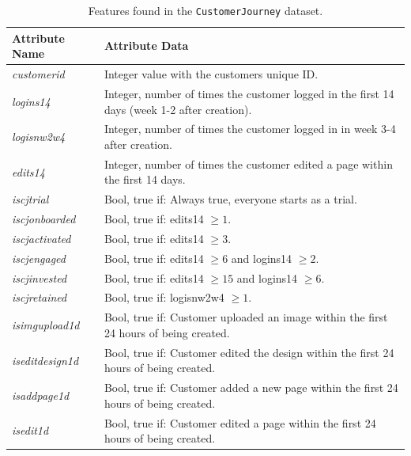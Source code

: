 \begin{table}[H]
	\centering
	\begin{tabularx}{\textwidth}{l|X}
		\textbf{Attribute Name} & \textbf{Attribute Data}                                                                      \\ \hline
		\textit{customerid}     & Integer value with the customers unique ID.                                                  \\
		\textit{logins14}       & Integer, number of times the customer logged in the first 14 days (week 1-2 after creation). \\
		\textit{logisnw2w4}     & Integer, number of times the customer logged in in week 3-4 after creation.                  \\
		\textit{edits14}        & Integer, number of times the customer edited a page within the first 14 days.                \\
		\textit{iscjtrial}      & Bool, true if: Always true, everyone starts as a trial.                                      \\
		\textit{iscjonboarded}  & Bool, true if: edits14 $\geq 1$.                                                             \\
		\textit{iscjactivated}  & Bool, true if: edits14 $\geq 3$.                                                             \\
		\textit{iscjengaged}    & Bool, true if: edits14 $\geq 6$ and logins14 $\geq 2$.                                       \\
		\textit{iscjinvested}   & Bool, true if: edits14 $\geq 15$ and logins14 $\geq 6$.                                      \\
		\textit{iscjretained}   & Bool, true if: logisnw2w4 $\geq 1$.                                                          \\
		\textit{isimgupload1d}  & Bool, true if: Customer uploaded an image within the first 24 hours of being created.        \\
		\textit{iseditdesign1d} & Bool, true if: Customer edited the design within the first 24 hours of being created.        \\
		\textit{isaddpage1d}    & Bool, true if: Customer added a new page within the first 24 hours of being created.         \\
		\textit{isedit1d}       & Bool, true if: Customer edited a page within the first 24 hours of being created.           
	\end{tabularx}
	\caption{Features found in the \texttt{CustomerJourney} dataset.}
	\label{tab:cjdatalayout}
\end{table}


